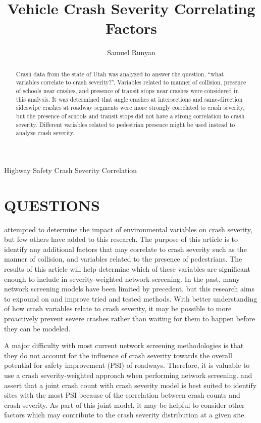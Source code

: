 \documentclass[3p, authoryear]{elsarticle} %
\begin{document}
\begin{frontmatter}

  \title{Vehicle Crash Severity Correlating Factors}
    \author[Brigham Young University]{Samuel Runyan}
      \address[Brigham Young University]{Civil and Environmental Engineering Department, 430 Engineering Building, Provo, Utah 84602}
    
  \begin{abstract}
  Crash data from the state of Utah was analyzed to answer the question, ``what variables correlate to crash severity?''. Variables related to manner of collision, presence of schools near crashes, and presence of transit stops near crashes were considered in this analysis. It was determined that angle crashes at intersections and same-direction sideswipe crashes at roadway segments were more strongly correlated to crash severity, but the presence of schools and transit stops did not have a strong correlation to crash severity. Different variables related to pedestrian presence might be used instead to analyze crash severity.
  \end{abstract}
   \begin{keyword} Highway Safety Crash Severity Correlation\end{keyword}
 \end{frontmatter}

\hypertarget{intro}{%
\section{QUESTIONS}\label{intro}}

\citet{ghadi2020} attempted to determine the impact of environmental variables on crash severity, but few others have added to this research. The purpose of this article is to identify any additional factors that may correlate to crash severity such as the manner of collision, and variables related to the presence of pedestrians. The results of this article will help determine which of these variables are significant enough to include in severity-weighted network screening. In the past, many network screening models have been limited by precedent, but this research aims to expound on and improve tried and tested methods. With better understanding of how crash variables relate to crash severity, it may be possible to more proactively prevent severe crashes rather than waiting for them to happen before they can be modeled.

A major difficulty with most current network screening methodologies is that they do not account for the influence of crash severity towards the overall potential for safety improvement (PSI) of roadways. Therefore, it is valuable to use a crash severity-weighted approach when performing network screening. \citet{yasmin2018} and \citet{afghari2020} assert that a joint crash count with crash severity model is best suited to identify sites with the most PSI because of the correlation between crash counts and crash severity. As part of this joint model, it may be helpful to consider other factors which may contribute to the crash severity distribution at a given site.
\end{document}
